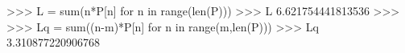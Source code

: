 
>>> L = sum(n*P[n] for n in range(len(P)))
>>> L
6.621754441813536
>>>
>>> Lq = sum((n-m)*P[n] for n in range(m,len(P)))
>>> Lq
3.310877220906768

